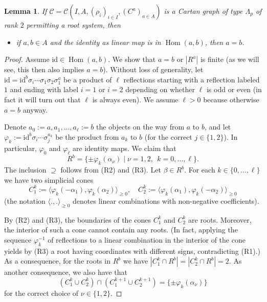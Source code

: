 \documentclass[11pt,a4paper]{amsart}
\newtheorem{Lemma}{Lemma}[section]
\theoremstyle{definition}
\numberwithin{equation}{section}
\newcommand{\id }{\mathrm{id}}
\DeclareMathOperator{\Hom}{Hom}
\newcommand{\rfl }{\rho }
\newcommand{\Cm }{C}
\newcommand{\Cc }{\mathcal{C}}
\newcommand{\s }{\sigma }
\begin{document}
\begin{Lemma}\label{lemC3}
If $\Cc =\Cc (I,A,(\rfl _i)_{i\in I},(\Cm ^a)_{a\in A})$ is a Cartan graph of type $\Lambda_p$ of rank $2$ permitting a root system, then
\begin{itemize}
  \item [(C3)] if $a,b\in A$ and the identity
  as linear map is in $\Hom (a,b)$, then $a=b$.
\end{itemize}
\end{Lemma}
\begin{proof}
Assume $\id\in\Hom(a,b)$. We show that $a=b$ or $|R^a|$ is finite (as we will see, this then also implies $a=b$).
Without loss of generality, let $\id = \id^b \s_i \cdots \s_1 \s_2 \s^a_1$ be a product of $\ell$ reflections starting with a reflection labeled $1$ and ending with label $i=1$ or $i=2$ depending on whether $\ell$ is odd or even (in fact it will turn out that $\ell$ is always even).
We assume $\ell>0$ because otherwise $a=b$ anyway.

Denote $a_0:=a,a_1,\ldots,a_\ell:=b$ the objects on the way from $a$ to $b$,
and let $\varphi_k:=\id^b \s_i \cdots \s_j^{a_k}$ be the product from $a_k$ to $b$ (for the correct $j\in\{1,2\}$). In particular,
$\varphi_0$ and 
$\varphi_{\ell}$ are identity maps.
We claim that
\begin{equation} \label{eq:Rb}
R^b = \{\pm\varphi_k(\alpha_\nu) \mid \nu=1,2,\:\: k=0,\ldots,\ell\}. 
\end{equation}
The inclusion $\supseteq$ follows from (R2) and (R3). 
Let $\beta\in R^b$.
For each $k\in \{0,\ldots,\ell\}$ we have two simplicial cones
$$
C^k_1:=\langle\varphi_k(-\alpha_1),\varphi_k(\alpha_2)\rangle_{\ge 0},
\quad
C^k_2:=\langle\varphi_k(\alpha_1),\varphi_k(-\alpha_2)\rangle_{\ge 0}
$$
(the notation $\langle .,.\rangle_{\ge 0}$
denotes linear combinations with non-negative
coefficients). 

By (R2) and (R3), the boundaries of the
cones $C_1^k$ and $C_2^k$ are roots. 
Moreover, the interior of such a cone cannot 
contain any roots. (In fact, applying the 
sequence $\varphi_k^{-1}$ of reflections 
to a linear combination
in the interior of the cone yields by (R3)
a root having coordinates with different
signs, contradicting (R1).) As a consequence, 
for the roots in $R^b$ we have 
$|C^k_1\cap R^b|=|C^k_2\cap R^b|=2$. 
As another consequence, we also have 
that
$$ (C^k_1\cup C^k_2) \cap (C^{k+1}_1\cup C^{k+1}_2) = \{ \pm \varphi_k(\alpha_\nu)\}$$
for the correct choice of $\nu\in \{1,2\}$.


\end{proof}
\end{document}
